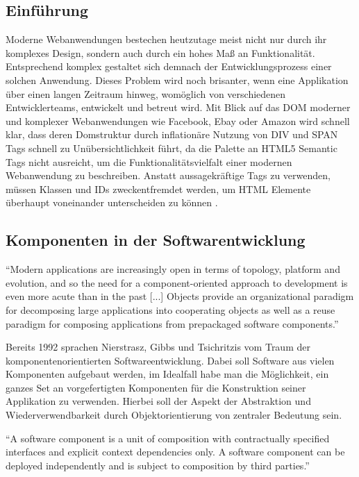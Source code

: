 \subsection{Einführung}

Moderne Webanwendungen bestechen heutzutage meist nicht nur durch ihr komplexes Design,
sondern auch durch ein hohes Maß an Funktionalität.
Entsprechend komplex gestaltet sich demnach der Entwicklungsprozess einer solchen Anwendung.
Dieses Problem wird noch brisanter, wenn eine Applikation über einen langen Zeitraum hinweg,
womöglich von verschiedenen Entwicklerteams, entwickelt und betreut wird. Mit Blick auf das \ac{DOM} moderner und komplexer Webanwendungen wie Facebook, Ebay oder Amazon
wird schnell klar, dass deren Domstruktur durch inflationäre Nutzung von DIV und SPAN Tags schnell zu Unübersichtlichkeit führt,
da die Palette an HTML5 Semantic Tags nicht ausreicht, um die Funktionalitätsvielfalt einer modernen Webanwendung zu beschreiben.
Anstatt aussagekräftige Tags zu verwenden, müssen Klassen und IDs zweckentfremdet werden, um HTML Elemente überhaupt voneinander unterscheiden zu können
\cite{sitepoint-introduction-to-webcomponents}.

\subsection{Komponenten in der Softwarentwicklung}

``Modern applications are increasingly
open in terms of topology,
platform and evolution, and so the
need for a component-oriented
approach to development is even
more acute than in the past [...]  Objects provide an organizational
paradigm for decomposing large
applications into cooperating objects
as well as a reuse paradigm for
composing applications from prepackaged
software components.''
\cite{nierstrasz1992component}

\vspace{0.5cm}

Bereits 1992 sprachen Nierstrasz, Gibbs und Tsichritzis vom Traum der komponentenorientierten Softwareentwicklung.
Dabei soll Software aus vielen Komponenten aufgebaut werden, im Idealfall habe man die Möglichkeit, ein
ganzes Set an vorgefertigten Komponenten für die Konstruktion seiner Applikation zu verwenden.
Hierbei soll der Aspekt der Abstraktion und Wiederverwendbarkeit durch Objektorientierung von zentraler Bedeutung sein.

\vspace{0.5cm}
``A software component is a unit of composition with contractually specified interfaces and explicit
context dependencies only. A software component can be deployed independently and is subject to composition
by third parties.''
\cite{Szyperski}
\vspace{0.5cm}

